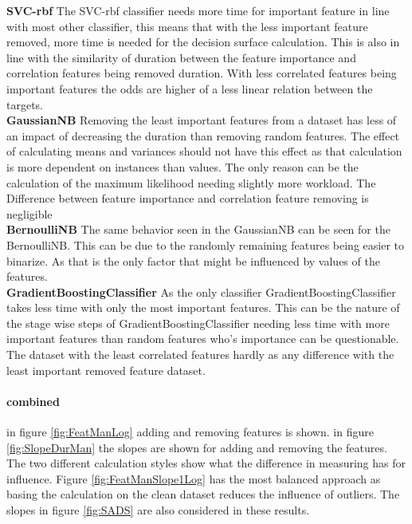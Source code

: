 \documentclass[a4paper,10pt]{article}
\begin{document}
\textbf{SVC-rbf} The SVC-rbf classifier needs more time for important feature in line with most other classifier, this means that with the less important feature removed, more time is needed for the decision surface calculation. This is also in line with the similarity of duration between the feature importance and correlation features being removed duration. With less correlated features being important features the odds are higher of a less linear relation between the targets.%
 \\

\textbf{GaussianNB} Removing the least important features from a dataset has less of an impact of decreasing the duration than removing random features. The effect of calculating means and variances should not have this effect as that calculation is more dependent on instances than values. The only reason can be the calculation of the maximum likelihood needing slightly more workload. The Difference between feature importance and correlation feature removing is negligible \\

\textbf{BernoulliNB} The same behavior seen in the GaussianNB can be seen for the BernoulliNB. This can be due to the randomly remaining features being easier to binarize. As that is the only factor that might be influenced by values of the features. \\

\textbf{GradientBoostingClassifier} As the only classifier GradientBoostingClassifier takes less time with only the most important features. This can be the nature of the stage wise steps of GradientBoostingClassifier needing less time with more important features than random features who's importance can be questionable. The dataset with the least correlated features hardly as any difference with the least important removed feature dataset.\\


\paragraph{combined}
in figure \ref{fig:FeatManLog} adding and removing features is shown.
in figure \ref{fig:SlopeDurMan} the slopes are shown for adding and removing the features. The two different calculation styles show what the difference in measuring has for influence. Figure \ref{fig:FeatManSlope1Log} has the most balanced approach as basing the calculation on the clean dataset reduces the influence of outliers. The slopes in figure \ref{fig:SADS} are also considered in these results.
\end{document}
